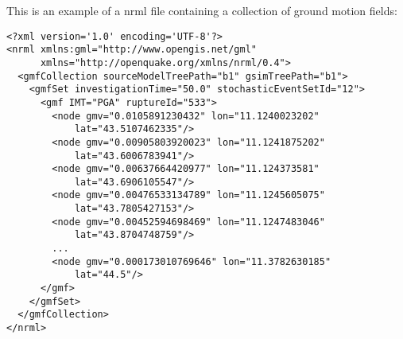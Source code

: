 This is an example of a nrml file containing a collection of
ground motion fields:
\begin{Verbatim}[frame=single, commandchars=\\\{\}, fontsize=\small]
<?xml version='1.0' encoding='UTF-8'?>
<nrml xmlns:gml="http://www.opengis.net/gml" 
      xmlns="http://openquake.org/xmlns/nrml/0.4">
  <gmfCollection sourceModelTreePath="b1" gsimTreePath="b1">
    <gmfSet investigationTime="50.0" stochasticEventSetId="12">
      <gmf IMT="PGA" ruptureId="533">
        <node gmv="0.0105891230432" lon="11.1240023202" 
            lat="43.5107462335"/>
        <node gmv="0.00905803920023" lon="11.1241875202" 
            lat="43.6006783941"/>
        <node gmv="0.00637664420977" lon="11.124373581" 
            lat="43.6906105547"/>
        <node gmv="0.00476533134789" lon="11.1245605075" 
            lat="43.7805427153"/>
        <node gmv="0.00452594698469" lon="11.1247483046" 
            lat="43.8704748759"/>
        ...
        <node gmv="0.000173010769646" lon="11.3782630185" 
            lat="44.5"/>
      </gmf>
    </gmfSet>
  </gmfCollection>
</nrml>
\end{Verbatim}
